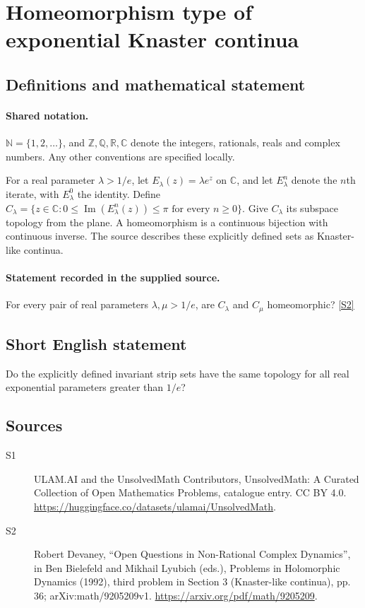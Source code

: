 \documentclass[11pt]{article}
\newcommand{\sref}[2]{\hyperlink{source:#1:#2}{[S#2]}}
\begin{document}
\section{Homeomorphism type of exponential Knaster continua}\label{statement}

\subsection{Definitions and mathematical statement}

\paragraph{Shared notation.}$\mathbb N=\{1,2,\ldots\}$, and $\mathbb Z,\mathbb Q,\mathbb R,\mathbb C$ denote the integers, rationals, reals and complex numbers. Any other conventions are specified locally.


For a real parameter $\lambda>1/e$, let $E_\lambda(z)=\lambda e^z$ on $\mathbb C$, and let $E_\lambda^n$ denote the $n$th iterate, with $E_\lambda^0$ the identity. Define $C_\lambda=\{z\in\mathbb C:0\leq\operatorname{Im}(E_\lambda^n(z))\leq\pi\text{ for every }n\geq0\}$. Give $C_\lambda$ its subspace topology from the plane. A homeomorphism is a continuous bijection with continuous inverse. The source describes these explicitly defined sets as Knaster-like continua.
\paragraph{Statement recorded in the supplied source.}
For every pair of real parameters $\lambda,\mu>1/e$, are $C_\lambda$ and $C_\mu$ homeomorphic? \sref{statement}{2}
\subsection{Short English statement}
Do the explicitly defined invariant strip sets have the same topology for all real exponential parameters greater than $1/e$?
\subsection{Sources}
\begin{description}
\item[\hypertarget{source:statement:1}{S1}] ULAM.AI and the UnsolvedMath Contributors, UnsolvedMath: A Curated Collection of Open Mathematics Problems, catalogue entry. CC BY 4.0. \url{https://huggingface.co/datasets/ulamai/UnsolvedMath}.
\item[\hypertarget{source:statement:2}{S2}] Robert Devaney, ``Open Questions in Non-Rational Complex Dynamics'', in Ben Bielefeld and Mikhail Lyubich (eds.), Problems in Holomorphic Dynamics (1992), third problem in Section 3 (Knaster-like continua), pp. 36; arXiv:math/9205209v1. \url{https://arxiv.org/pdf/math/9205209}.
\end{description}
\label{end:statement}
\end{document}
